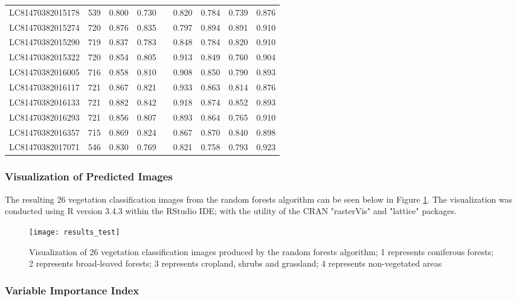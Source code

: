 \begin{ThreePartTable}
\begin{longtable}{L{3.1cm} L{1.1cm} L{2.2cm} L{1.7cm} L{0.1cm} L{1cm} L{1cm}  L{1cm}  L{1cm}}
		LC81470382015178 &539 &0.800&0.730&&0.820&0.784&0.739&0.876 \\[0.05cm]
		LC81470382015274 &720 &0.876&0.835&&0.797&0.894&0.891&0.910 \\[0.05cm]
		LC81470382015290 &719 &0.837&0.783&&0.848&0.784&0.820&0.910 \\[0.05cm]
		LC81470382015322 &720 &0.854&0.805&&0.913&0.849&0.760&0.904 \\[0.05cm]
		LC81470382016005 &716 &0.858&0.810&&0.908&0.850&0.790& 0.893\\ [0.05cm]
		LC81470382016117 &721 &0.867&0.821&&0.933&0.863&0.814& 0.876\\[0.05cm]
		LC81470382016133 &721 &0.882&0.842&&0.918&0.874&0.852&0.893 \\[0.05cm]
		LC81470382016293 &721 &0.856&0.807&&0.893&0.864&0.765&0.910 \\[0.05cm]
		LC81470382016357 &715 &0.869&0.824&&0.867&0.870&0.840&0.898 \\[0.05cm]
		LC81470382017071 &546 &0.830&0.769&&0.821&0.758&0.793& 0.923 \\[0.05cm]
		\bottomrule[0.25mm]
	\end{longtable}
\end{ThreePartTable}

\subsubsection{Visualization of Predicted Images}

\justify
The resulting 26 vegetation classification images from the random forests algorithm can be seen below in Figure \ref{fig20}. The visualization was conducted using R version 3.4.3 within the RStudio IDE; with the utility of the CRAN "rasterVis" and "lattice" packages.

\begin{figure}[H]
	\centering
	\texttt{[image: results\_test]}
	\caption{Visualization of 26 vegetation classification images produced by the random forests algorithm; 1 represents coniferous forests; 2 represents broad-leaved forests; 3 represents cropland, shrubs and grassland; 4 represents non-vegetated areas}
	\label{fig20}
\end{figure}

\subsubsection{Variable Importance Index}

